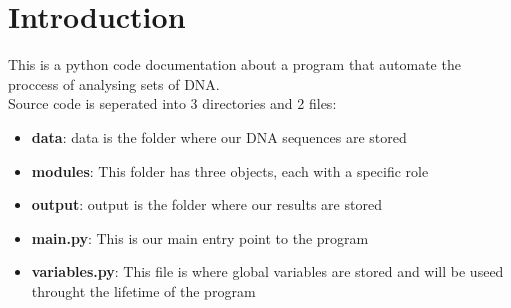 \documentclass[11pt]{article}
\begin{document}
\section{Introduction}
This is a python code documentation about a program that automate the proccess of analysing sets of DNA.\\
Source code is seperated into 3 directories and 2 files:
\begin{itemize}
\item{\textbf{data}: data is the folder where our DNA sequences are stored}
\item{\textbf{modules}: This folder has three objects, each with a specific role}
\item{\textbf{output}: output is the folder where our results are stored}
\item{\textbf{main.py}: This is our main entry point to the program}
\item{\textbf{variables.py}: This file is where global variables are stored and will be useed throught the lifetime of the program}
\end{itemize}
\end{document}

